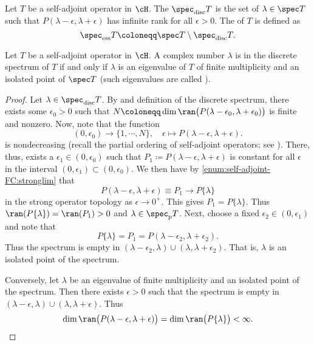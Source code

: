 \documentclass[oneside,reqno,letterpaper]{amsart}
\newcommand{\pspec}{\spec_{\mathrm{p}}}
\newcommand{\discspec}{\spec_{\text{disc}}}
\newcommand{\essspec}{\spec_{\text{ess}}}
\begin{document}
\begin{definition}
  Let \(T\) be a self-adjoint operator in \(\cH\). 
  The  \(\discspec T\) is the set of \(\lambda \in \spec T\) such that \(P(\lambda - \epsilon, \lambda + \epsilon)\) has infinite rank for all \(\epsilon > 0\). 
  The  of \(T\) is defined as
  \[
    \essspec T \coloneqq \spec T \setminus \discspec T.
  \]
\end{definition}

\begin{proposition}
  Let \(T\) be a self-adjoint operator in \(\cH\). 
  A complex number \(\lambda\) is in the discrete spectrum of \(T\) if and only if \(\lambda\) is an eigenvalue of \(T\) of finite multiplicity and an isolated point of \(\spec T\) (such eigenvalues are called ). 
\end{proposition}
\begin{proof}
  Let \(\lambda \in \discspec T\). 
  By  and definition of the discrete spectrum, there exists some \(\epsilon_0 > 0\) such that \(N \coloneqq \dim \ran\big(P(\lambda - \epsilon_0, \lambda + \epsilon_0)\big)\) is finite and nonzero. 
  Now, note that the function
  \[
  (0, \epsilon_0) \longrightarrow \{1, \cdots, N\}, 
  \quad \epsilon \longmapsto P(\lambda - \epsilon, \lambda + \epsilon). 
  \] 
  is nondecreasing (recall the partial ordering of self-adjoint operators; see ). 
  There, thus, exists a \(\epsilon_1 \in (0, \epsilon_0)\) such that \(P_1 \coloneqq P(\lambda - \epsilon, \lambda + \epsilon)\) is constant for all \(\epsilon\) in the interval \((0, \epsilon_1) \subset (0, \epsilon_0)\). 
  We then have by  \ref{enum:self-adjoint-FC:stronglim} that 
  \[
    P(\lambda - \epsilon, \lambda + \epsilon) \equiv P_1 \longrightarrow P \{\lambda\}
  \]
  in the strong operator topology as \(\epsilon \to 0^+\). 
  This gives \(P_1 = P \{\lambda\}\). 
  Thus \(\ran(P \{\lambda\}) = \ran(P_1) > 0\) and \(\lambda \in \pspec T\). 
  Next, choose a fixed \(\epsilon_2 \in (0, \epsilon_1)\) and note that 
  \[
    P \{\lambda\} = P_1 = P(\lambda - \epsilon_2, \lambda + \epsilon_2) . 
  \] 
  Thus the spectrum is empty in \((\lambda - \epsilon_2, \lambda) \cup (\lambda, \lambda + \epsilon_2)\). 
  That is, \(\lambda\) is an isolated point of the spectrum. 


  Conversely, let \(\lambda\) be an eigenvalue of finite multiplicity and an isolated point of the spectrum. 
  Then there exists \(\epsilon > 0\) such that the spectrum is empty in \((\lambda - \epsilon, \lambda) \cup (\lambda, \lambda + \epsilon)\). 
  Thus 
  \[
    \dim\ran\big(P(\lambda - \epsilon, \lambda + \epsilon)\big) = \dim\ran\big(P \{\lambda\} \big) < \infty . 
  \] 
\end{proof}
\end{document}

